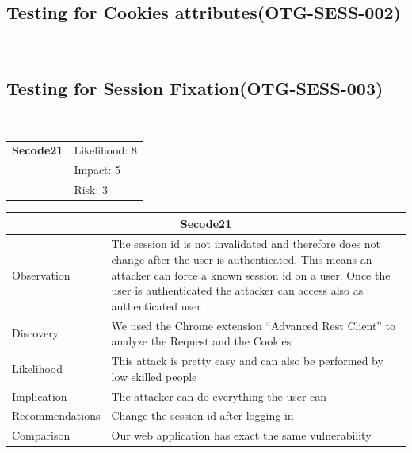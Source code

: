 \documentclass[headsepline,footsepline,footinclude=false,oneside,fontsize=11pt,paper=a4,listof=totoc,bibliography=totoc]{scrbook} %
\begin{document}
\pagebreak
\subsection{Testing for Cookies attributes(OTG-SESS-002)}\
\pagebreak
\subsection{Testing for Session Fixation(OTG-SESS-003)}\

\begin{tabular}{cR{12cm}}
	\textbf{Secode21} & Likelihood: 8\\& Impact: 5\\& Risk: 3
\end{tabular}

\begin{tabular}{ l|p{11cm}  }
	\hline
	\multicolumn{2}{c}{\textbf{Secode21}} \\
	\hline
	Observation   & The session id is not invalidated and therefore does not change after the user is authenticated. This means
	an attacker can force a known session id on a user. Once the user is authenticated the attacker can access also as authenticated
	user \\
	Discovery  & We used the Chrome extension ``Advanced Rest Client'' to analyze the Request and the Cookies\\
	Likelihood & This attack is pretty easy and can also be performed by low skilled people\\
	Implication    & The attacker can do everything the user can \\
	Recommendations& Change the session id after logging in \\
	Comparison& Our web application has exact the same vulnerability\\
	\hline
\end{tabular}
\\
\vspace{0.5cm}
\\
\end{document}
